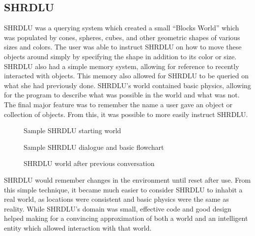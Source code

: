 \subsection{SHRDLU}                                                                    
SHRDLU was a querying system which created a small ``Blocks World'' which was populated by cones, spheres, cubes, and other geometric shapes of various sizes and colors. \cite{winograd} The user was able to instruct SHRDLU on how to move these objects around simply by specifying the shape in addition to its color or size. SHRDLU also had a simple memory system, allowing for reference to recently interacted with objects. This memory also allowed for SHRDLU to be queried on what she had previously done. SHRDLU's world contained basic physics, allowing for the program to describe what was possible in the world and what was not. The final major feature was to remember the name a user gave an object or collection of objects. From this, it was possible to more easily instruct SHRDLU.                      
                                                                                          
\begin{figure}[!ht]
	\begin{center}
	\end{center}
	\caption{Sample SHRDLU starting world}\label{SHRDLU_Start}
\end{figure}

\begin{figure}[!ht]
	\begin{center}
	\end{center}
	\caption{Sample SHRDLU dialogue and basic flowchart}\label{SHRDLU_Flow}
\end{figure}

\begin{figure}[!ht]
	\begin{center}
	\end{center}
	\caption{SHRDLU world after previous conversation}\label{SHRDLU_Changed}
\end{figure}

SHRDLU would remember changes in the environment until reset after use. From this simple technique, it became much easier to consider SHRDLU to inhabit a real world, as locations were consistent and basic physics were the same as reality. While SHRDLU's domain was small, effective code and good design helped making for a convincing approximation of both a world and an intelligent entity which allowed interaction with that world.

